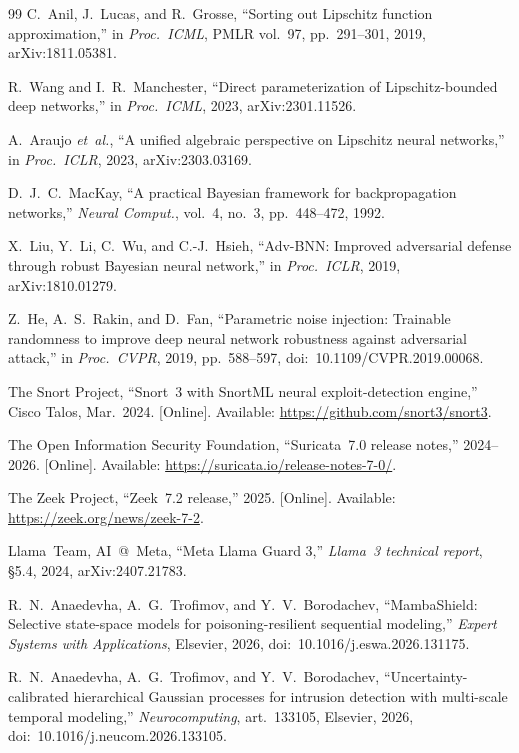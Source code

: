 \documentclass{ieeeaccess}
\begin{document}
\begin{thebibliography}{99}
 C.~Anil, J.~Lucas, and R.~Grosse,
``Sorting out Lipschitz function approximation,'' in \emph{Proc.\ ICML},
PMLR vol.~97, pp.~291--301, 2019, arXiv:1811.05381.

 R.~Wang and I.~R.~Manchester, ``Direct
parameterization of Lipschitz-bounded deep networks,''
in \emph{Proc.\ ICML}, 2023, arXiv:2301.11526.

 A.~Araujo \textit{et~al.}, ``A unified
algebraic perspective on Lipschitz neural networks,''
in \emph{Proc.\ ICLR}, 2023, arXiv:2303.03169.

 D.~J.~C.~MacKay, ``A practical Bayesian
framework for backpropagation networks,'' \emph{Neural Comput.},
vol.~4, no.~3, pp.~448--472, 1992.

 X.~Liu, Y.~Li, C.~Wu, and C.-J.~Hsieh,
``Adv-BNN: Improved adversarial defense through robust Bayesian
neural network,'' in \emph{Proc.\ ICLR}, 2019, arXiv:1810.01279.

 Z.~He, A.~S.~Rakin, and D.~Fan,
``Parametric noise injection: Trainable randomness to improve deep
neural network robustness against adversarial attack,''
in \emph{Proc.\ CVPR}, 2019, pp.~588--597,
doi:~10.1109/CVPR.2019.00068.

 The Snort Project, ``Snort~3 with SnortML neural
exploit-detection engine,'' Cisco Talos, Mar.~2024.
[Online]. Available: \url{https://github.com/snort3/snort3}.

 The Open Information Security Foundation,
``Suricata~7.0 release notes,'' 2024--2026.
[Online]. Available: \url{https://suricata.io/release-notes-7-0/}.

 The Zeek Project, ``Zeek~7.2 release,'' 2025.
[Online]. Available: \url{https://zeek.org/news/zeek-7-2}.

 Llama~Team, AI~@~Meta, ``Meta Llama Guard 3,''
\emph{Llama~3 technical report}, \S5.4, 2024, arXiv:2407.21783.

 R.~N.~Anaedevha, A.~G.~Trofimov, and
Y.~V.~Borodachev, ``MambaShield: Selective state-space models for
poisoning-resilient sequential modeling,'' \emph{Expert Systems with
Applications}, Elsevier, 2026,
doi:~10.1016/j.eswa.2026.131175.

 R.~N.~Anaedevha, A.~G.~Trofimov, and
Y.~V.~Borodachev, ``Uncertainty-calibrated hierarchical Gaussian
processes for intrusion detection with multi-scale temporal
modeling,'' \emph{Neurocomputing}, art.~133105, Elsevier, 2026,
doi:~10.1016/j.neucom.2026.133105.


\end{thebibliography}
\end{document}
